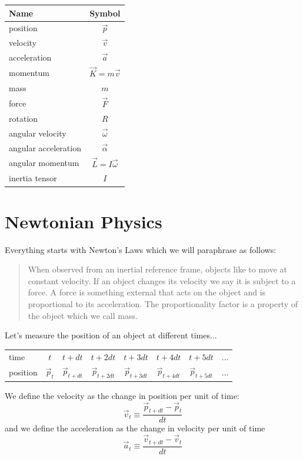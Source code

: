 \documentclass[12pt]{article}
\begin{document}
\begin{tabular}{|l|c|} \hline
Name & Symbol \\ \hline
position & $\vec p$ \\
velocity & $\vec v$ \\
acceleration & $\vec a$ \\
momentum & $\vec K = m \vec v$ \\
mass & $m$ \\
force & $\vec F$ \\
rotation & $R$ \\
angular velocity & $\vec \omega$ \\
angular acceleration & $\vec \alpha$ \\
angular momentum & $\vec L = I \vec \omega$ \\
inertia tensor & $I$ \\ \hline
\end{tabular}

\section{Newtonian Physics}

Everything starts with Newton's Laws which we will paraphrase as
follows:

\begin{quote}
When observed from an inertial reference frame, objects like to move at constant velocity. If an object changes its velocity we say it is subject to a force. A force is something external that acts on the object and is proportional to its acceleration. The proportionality factor is a property of the object which we call mass.
\end{quote}

Let's measure the position of an object at different times...

\begin{center}
\begin{tabular}{lccccccc} \hline
time & $t$ & $t+dt$ & $t+2dt$ & $t+3dt$ & $t+4dt$ & $t+5dt$ & ... \\
position & $\vec p_t$ & $\vec p_{t+dt}$ & $\vec p_{t+2dt}$ & $\vec p_{t+3dt}$ & $\vec p_{t+4dt}$ & $\vec p_{t+5dt}$ & ... \\ \hline
\end{tabular}
\end{center}

We define the velocity as the change in position per unit of time:
\begin{equation}
\vec v_t \equiv \frac{\vec p_{t+dt}-\vec p_t}{dt}
\label{one}
\end{equation}
and we define the acceleration as the change in velocity per unit of time
\begin{equation}
\vec a_t \equiv \frac{\vec v_{t+dt}-\vec v_t}{dt}
\label{two}
\end{equation}
\end{document}
